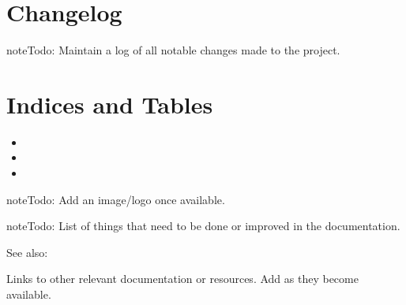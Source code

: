 \documentclass[letterpaper,10pt,english]{sphinxmanual}
\begin{document}
\chapter{Changelog}
\label{\detokenize{index:changelog}}
\begin{sphinxadmonition}{note}{\label{\detokenize{index:id5}}Todo:}
\sphinxAtStartPar
Maintain a log of all notable changes made to the project.
\end{sphinxadmonition}


\chapter{Indices and Tables}
\label{\detokenize{index:indices-and-tables}}\begin{itemize}
\item {} 
\sphinxAtStartPar
{}

\item {} 
\sphinxAtStartPar
{}

\item {} 
\sphinxAtStartPar
{}

\end{itemize}

\begin{sphinxadmonition}{note}{\label{\detokenize{index:id6}}Todo:}
\sphinxAtStartPar
Add an image/logo once available.
\end{sphinxadmonition}

\noindent{}

\begin{sphinxadmonition}{note}{\label{\detokenize{index:id7}}Todo:}
\sphinxAtStartPar
List of things that need to be done or improved in the documentation.
\end{sphinxadmonition}


\begin{sphinxseealso}{See also:}

\sphinxAtStartPar
Links to other relevant documentation or resources. Add as they become available.


\end{sphinxseealso}
\end{document}

